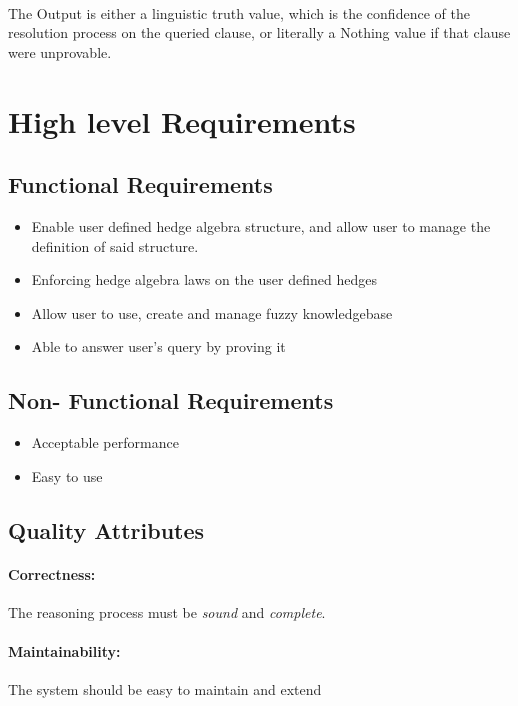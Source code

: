 \documentclass[../gr-final.tex]{subfiles}
\begin{document}
\paragraph{} The Output is either a linguistic truth value, which is
the confidence of the resolution process on the queried clause, or
literally a Nothing value if that clause were unprovable.

\section{High level Requirements}
\subsection{Functional Requirements}
\begin{itemize}
\item Enable user defined hedge algebra structure, and allow user to
  manage the definition of said structure.
\item Enforcing hedge algebra laws on the user defined hedges
\item Allow user to use, create and manage fuzzy knowledgebase
\item Able to answer user's query by proving it
\end{itemize}

\subsection{Non- Functional Requirements}
\begin{itemize}
\item Acceptable performance
\item Easy to use
\end{itemize}

\subsection{Quality Attributes}

\paragraph{Correctness:}
The reasoning process must be {\em sound} and {\em complete}.

\paragraph{Maintainability:}
The system should be easy to maintain and extend
\end{document}
